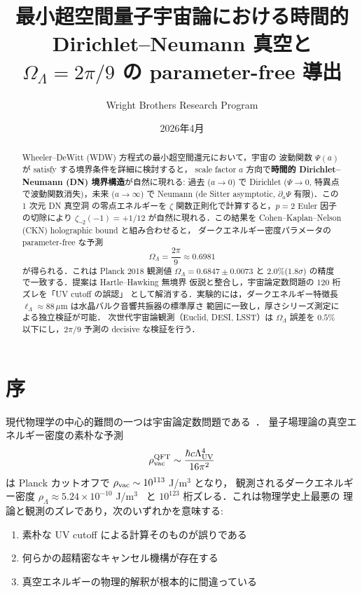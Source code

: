 \documentclass[11pt,a4paper]{article}
\title{最小超空間量子宇宙論における時間的\\Dirichlet--Neumann 真空と\\$\Omega_\Lambda = 2\pi/9$ の parameter-free 導出}
\author{Wright Brothers Research Program}
\date{2026年4月}
\begin{document}
\maketitle

\begin{abstract}
Wheeler--DeWitt (WDW) 方程式の最小超空間還元において，宇宙の
波動関数 $\Psi(a)$ が satisfy する境界条件を詳細に検討すると，
scale factor $a$ 方向で\textbf{時間的 Dirichlet--Neumann (DN)
境界構造}が自然に現れる: 過去 ($a \to 0$) で Dirichlet ($\Psi \to 0$,
特異点で波動関数消失)，未来 ($a \to \infty$) で Neumann
(de Sitter asymptotic, $\partial_a \Psi$ 有限)．この 1 次元 DN 真空洞
の零点エネルギーを $\zeta$ 関数正則化で計算すると，$p=2$ Euler 因子
の切除により $\zeta_{\neg 2}(-1) = +1/12$ が自然に現れる．この結果を
Cohen--Kaplan--Nelson (CKN) holographic bound と組み合わせると，
ダークエネルギー密度パラメータの parameter-free な予測
\begin{equation*}
\Omega_\Lambda = \frac{2\pi}{9} \approx 0.6981
\end{equation*}
が得られる．これは Planck 2018 観測値 $\Omega_\Lambda = 0.6847 \pm 0.0073$
と 2.0\%($1.8\sigma$) の精度で一致する．提案は Hartle--Hawking 無境界
仮説と整合し，宇宙論定数問題の 120 桁ズレを「UV cutoff の誤認」
として解消する．実験的には，ダークエネルギー特徴長
$\ell_\Lambda \approx 88\,\mu$m は水晶バルク音響共振器の標準厚さ
範囲に一致し，厚さシリーズ測定による独立検証が可能．
次世代宇宙論観測（Euclid, DESI, LSST）は $\Omega_\Lambda$ 誤差を
$0.5\%$ 以下にし，$2\pi/9$ 予測の decisive な検証を行う．
\end{abstract}

\section{序}

現代物理学の中心的難問の一つは宇宙論定数問題である~\cite{Weinberg1989}．
量子場理論の真空エネルギー密度の素朴な予測
\begin{equation}
\rho_{\rm vac}^{\rm QFT} \sim \frac{\hbar c \Lambda_{\rm UV}^4}{16\pi^2}
\end{equation}
は Planck カットオフで $\rho_{\rm vac} \sim 10^{113}$ J/m$^3$ となり，
観測されるダークエネルギー密度 $\rho_\Lambda \approx 5.24 \times 10^{-10}$
J/m$^3$~\cite{Planck2018} と $10^{123}$ 桁ズレる．これは物理学史上最悪の
理論と観測のズレであり，次のいずれかを意味する:
\begin{enumerate}
\item 素朴な UV cutoff による計算そのものが誤りである
\item 何らかの超精密なキャンセル機構が存在する
\item 真空エネルギーの物理的解釈が根本的に間違っている
\end{enumerate}
\end{document}
